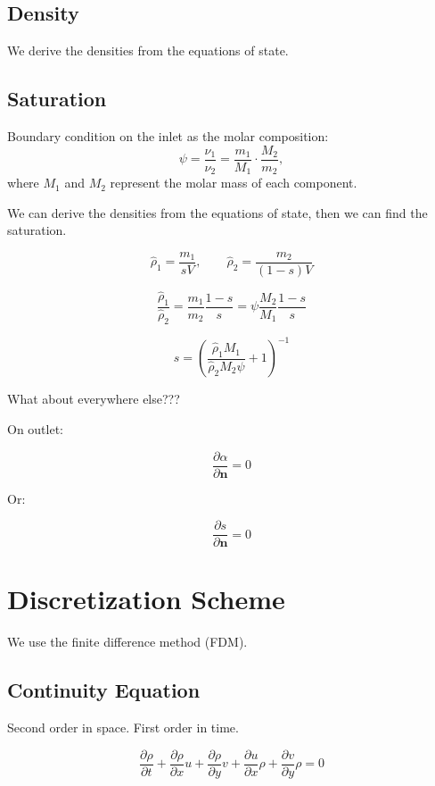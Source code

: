 \documentclass[a4paper,12pt]{article}
\begin{document}
\subsection{Density}

We derive the densities from the equations of state.

\subsection{Saturation}
    Boundary condition on the inlet as the molar
    composition:
    \[
        \psi = \frac{\nu_1}{\nu_2} = \frac{m_1}{M_1}
        \cdot \frac{M_2}{m_2},
    \] 
    where \(M_1\) and \(M_2\) represent the molar mass 
    of each component.

    We can derive the densities from the equations of state,
    then we can find the saturation.

    \[
    \hat \rho_1 = \frac{m_1}{sV}, \qquad
    \hat \rho_2 = \frac{m_2}{(1 - s)V}
    \] 

    \[
    \frac{\hat \rho_1}{\hat \rho_2} = \frac{m_1}{m_2}
    \frac{1 - s}{s}
    = \psi \frac{M_2}{M_1}\frac{1 - s}{s}
    \] 

    \[
        s = \left( 
        \frac{\hat \rho_1 M_1}{\hat \rho_2 M_2 \psi}
    + 1 \right)^{-1}
    \] 

    {\color{red}What about everywhere else???}

    On outlet:

    \[
    \frac{\partial \alpha}{\partial \bm{n}} = 0
    \] 

    Or:

    \[
    \frac{\partial s}{\partial \bm{n}} = 0 
    \] 

\section{Discretization Scheme}

We use the finite difference method (FDM).

\subsection{Continuity Equation}

Second order in space. First order in time.

\[
\frac{\partial \rho}{\partial t}
+ \frac{\partial \rho}{\partial x} u
+ \frac{\partial \rho}{\partial y} v
+ \frac{\partial u}{\partial x} \rho
+ \frac{\partial v}{\partial y} \rho = 0
\] 
\end{document}
